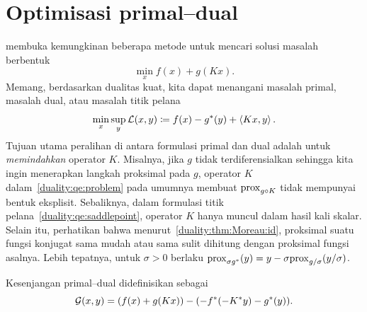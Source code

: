 \section{Optimisasi primal--dual}

 membuka kemungkinan beberapa metode untuk mencari solusi masalah berbentuk
\begin{equation}\label{duality:qe:problem}
    \min_x f(x) + g(Kx).
\end{equation}
Memang, berdasarkan dualitas kuat, kita dapat menangani masalah primal, masalah dual, atau masalah titik pelana
\begin{equation}\label{duality:qe:saddlepoint}
    \min_x \sup_y \mathcal{L}(x,y)\coloneqq f(x) -g^*(y) + \left\langle Kx , y\right\rangle.
\end{equation}
Tujuan utama peralihan di antara formulasi primal dan dual adalah untuk \emph{memindahkan} operator $K$. Misalnya, jika $g$ tidak terdiferensialkan sehingga kita ingin menerapkan langkah proksimal pada $g$, operator $K$ dalam~\eqref{duality:qe:problem} pada umumnya membuat $\mathrm{prox}_{g\circ K}$ tidak mempunyai bentuk eksplisit. Sebaliknya, dalam formulasi titik pelana~\eqref{duality:qe:saddlepoint}, operator $K$ hanya muncul dalam hasil kali skalar. Selain itu, perhatikan bahwa menurut~\cref{duality:thm:Moreau:id}, proksimal suatu fungsi konjugat sama mudah atau sama sulit dihitung dengan proksimal fungsi asalnya. Lebih tepatnya, untuk $\sigma>0$ berlaku $\mathrm{prox}_{\sigma g^*}(y)=y-\sigma\mathrm{prox}_{g/\sigma}(y/\sigma)$.

Kesenjangan primal--dual didefinisikan sebagai
\begin{equation}
    \mathcal{G}(x,y) = (f(x) + g(Kx)) - (-f^*(-K^*y) - g^*(y)).
\end{equation}

